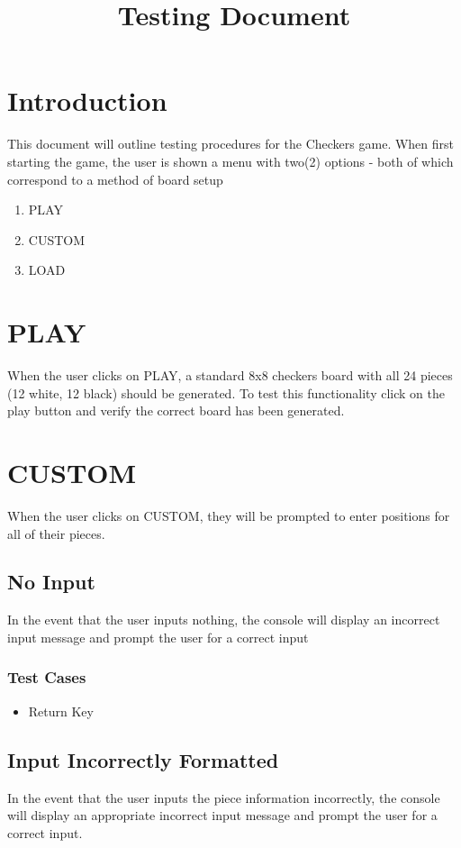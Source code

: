 \documentclass{article}
\title{\bf Testing Document}
\date{\vspace{-5ex}}
\begin{document}
\maketitle
\tableofcontents

\section{Introduction}
This document will outline testing procedures for the Checkers game. When first starting the game, the user is shown a menu with two(2) options - both of which correspond to a method of board setup 
\begin{enumerate}
\item PLAY
\item CUSTOM
\item LOAD
\end{enumerate}

\section{PLAY}
When the user clicks on PLAY, a standard 8x8 checkers board with all 24 pieces (12 white, 12 black) should be generated.
To test this functionality click on the play button and verify the correct board has been generated.

\section{CUSTOM}
When the user clicks on CUSTOM, they will be prompted to enter positions for all of their pieces.

\subsection{No Input}
In the event that the user inputs nothing, the console will display an incorrect input message and prompt the user for a correct input

\subsubsection*{Test Cases}
\begin{itemize}
\item Return Key
\end{itemize}

\subsection{Input Incorrectly Formatted}
In the event that the user inputs the piece information incorrectly, the console will display an appropriate incorrect input message and prompt the user for a correct input. 
\end{document}
